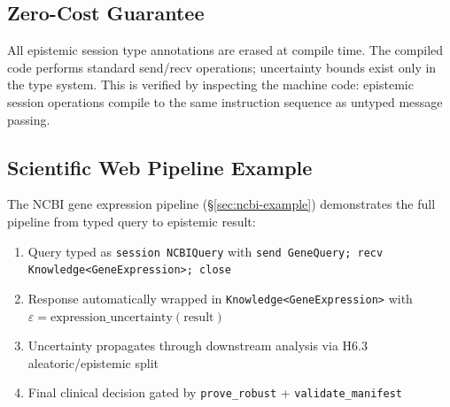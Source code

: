 \subsection{Zero-Cost Guarantee}
All epistemic session type annotations are erased at compile time.
The compiled code performs standard send/recv operations; uncertainty
bounds exist only in the type system. This is verified by inspecting
the machine code: epistemic session operations compile to the same
instruction sequence as untyped message passing.

\subsection{Scientific Web Pipeline Example}
The NCBI gene expression pipeline (\S\ref{sec:ncbi-example}) demonstrates
the full pipeline from typed query to epistemic result:
\begin{enumerate}
\item Query typed as \texttt{session NCBIQuery} with \texttt{send GeneQuery; recv Knowledge<GeneExpression>; close}
\item Response automatically wrapped in \texttt{Knowledge<GeneExpression>} with $\varepsilon = \text{expression\_uncertainty}(\text{result})$
\item Uncertainty propagates through downstream analysis via H6.3 aleatoric/epistemic split
\item Final clinical decision gated by \texttt{prove\_robust} + \texttt{validate\_manifest}
\end{enumerate}
